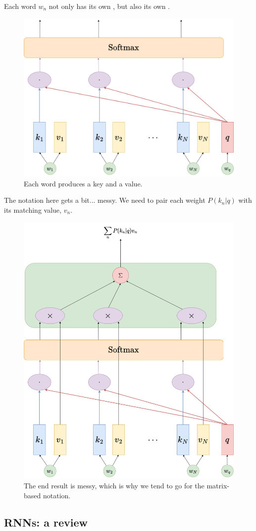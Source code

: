         Each word $w_n$ not only has its own , but also its own .

        \begin{figure}[H]
            \centering
            \includegraphics[width=0.45\linewidth]{images/transformers_images/softmax_value_vectors.png}
            \caption*{Each word produces a key and a value.}
        \end{figure}

        The notation here gets a bit... messy. We need to pair each weight $P(k_n|q)$ with its matching value, $v_n$.

        \begin{figure}[H]
            \centering
            \includegraphics[width=0.45\linewidth]{images/transformers_images/elementwise_attention.png}
            \caption*{The end result is messy, which is why we tend to go for the matrix-based notation.}
        \end{figure}

        


        


        


    \pagebreak
        
    \subsection{RNNs: a review}

